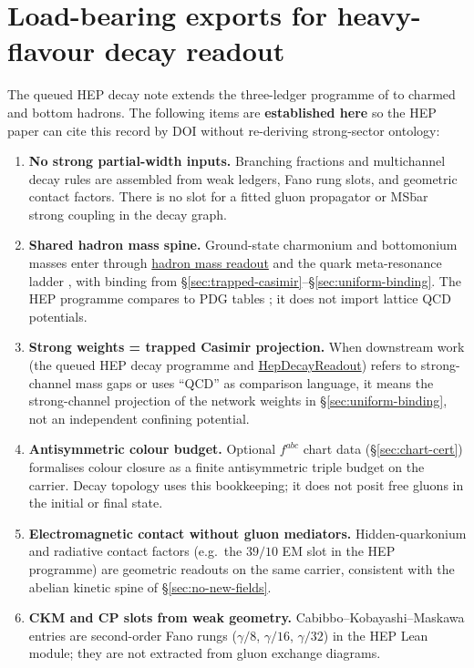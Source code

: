\documentclass[11pt]{amsart}
\newcommand{\leanterm}[2]{\hyperref[#1]{#2}}
\begin{document}
\section{Load-bearing exports for heavy-flavour decay readout}
\label{sec:hep-bridge}

The queued HEP decay note \cite{hqiv-hep-decay-paper} extends the three-ledger
programme of \cite{hqiv-nucleon-binding-paper} to charmed and bottom hadrons. The
following items are \textbf{established here} so the HEP paper can cite this record
by DOI without re-deriving strong-sector ontology:

\begin{enumerate}[label=\textbf{H\arabic*.},leftmargin=2.5em]
\item \textbf{No strong partial-width inputs.}
  Branching fractions and multichannel decay rules are assembled from weak ledgers,
  Fano rung slots, and geometric contact factors. There is no slot for a fitted
  gluon propagator or MS\=bar strong coupling in the decay graph.

\item \textbf{Shared hadron mass spine.}
  Ground-state charmonium and bottomonium masses enter through
  \leanterm{lean:hadron-readout}{hadron mass readout} and the quark meta-resonance
  ladder \cite{hqiv-tuft-sm-lagrangian-paper}, with binding from
  \S\ref{sec:trapped-casimir}--\S\ref{sec:uniform-binding}. The HEP programme
  compares to PDG tables \cite{pdg2024}; it does not import lattice QCD potentials.

\item \textbf{Strong weights = trapped Casimir projection.}
  When downstream work (the queued HEP decay programme and
  \leanterm{lean:hep-decay}{HepDecayReadout}) refers to strong-channel mass gaps
  or uses ``QCD'' as comparison language, it means the strong-channel projection
  of the network weights in \S\ref{sec:uniform-binding}, not an independent
  confining potential.

\item \textbf{Antisymmetric colour budget.}
  Optional $f^{abc}$ chart data (\S\ref{sec:chart-cert}) formalises colour closure as
  a finite antisymmetric triple budget on the carrier. Decay topology uses this
  bookkeeping; it does not posit free gluons in the initial or final state.

\item \textbf{Electromagnetic contact without gluon mediators.}
  Hidden-quarkonium and radiative contact factors (e.g.\ the $39/10$ EM slot in the
  HEP programme) are geometric readouts on the same carrier, consistent with the
  abelian kinetic spine of \S\ref{sec:no-new-fields}.

\item \textbf{CKM and CP slots from weak geometry.}
  Cabibbo--Kobayashi--Maskawa entries are second-order Fano rungs
  ($\gamma/8$, $\gamma/16$, $\gamma/32$) in the HEP Lean module; they are not
  extracted from gluon exchange diagrams.
\end{enumerate}
\end{document}
